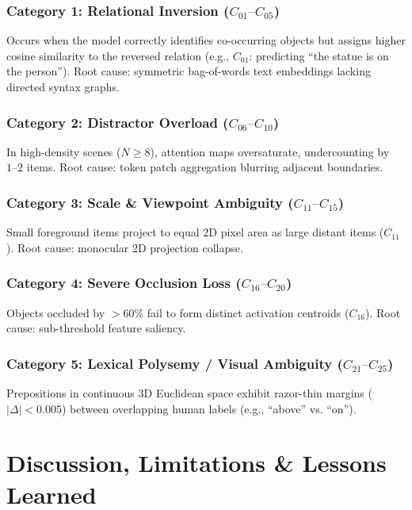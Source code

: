 \documentclass[conference]{IEEEtran}
\begin{document}
\subsubsection{Category 1: Relational Inversion \texorpdfstring{($C_{01}\text{--}C_{05}$)}{(C01--C05)}}
Occurs when the model correctly identifies co-occurring objects but assigns higher cosine similarity to the reversed relation (e.g., $C_{01}$: predicting ``the statue is on the person''). Root cause: symmetric bag-of-words text embeddings lacking directed syntax graphs.

\subsubsection{Category 2: Distractor Overload \texorpdfstring{($C_{06}\text{--}C_{10}$)}{(C06--C10)}}
In high-density scenes ($N \ge 8$), attention maps oversaturate, undercounting by $1\text{--}2$ items. Root cause: token patch aggregation blurring adjacent boundaries.

\subsubsection{Category 3: Scale \& Viewpoint Ambiguity \texorpdfstring{($C_{11}\text{--}C_{15}$)}{(C11--C15)}}
Small foreground items project to equal 2D pixel area as large distant items ($C_{11}$). Root cause: monocular 2D projection collapse.

\subsubsection{Category 4: Severe Occlusion Loss \texorpdfstring{($C_{16}\text{--}C_{20}$)}{(C16--C20)}}
Objects occluded by $>60\%$ fail to form distinct activation centroids ($C_{16}$). Root cause: sub-threshold feature saliency.

\subsubsection{Category 5: Lexical Polysemy / Visual Ambiguity \texorpdfstring{($C_{21}\text{--}C_{25}$)}{(C21--C25)}}
Prepositions in continuous 3D Euclidean space exhibit razor-thin margins ($|\Delta| < 0.005$) between overlapping human labels (e.g., ``above'' vs. ``on'').

\section{Discussion, Limitations \& Lessons Learned}
\label{sec:discussion}
\end{document}
